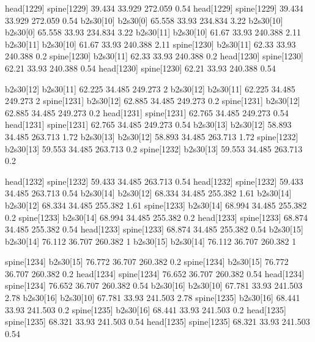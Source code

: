 head[1229]    spine[1229]    39.434    33.929    272.059    0.54
head[1229]    spine[1229]    39.434    33.929    272.059    0.54
b2s30[10]    b2s30[0]    65.558    33.93    234.834    3.22
b2s30[10]    b2s30[0]    65.558    33.93    234.834    3.22
b2s30[11]    b2s30[10]    61.67    33.93    240.388    2.11
b2s30[11]    b2s30[10]    61.67    33.93    240.388    2.11
spine[1230]    b2s30[11]    62.33    33.93    240.388    0.2
spine[1230]    b2s30[11]    62.33    33.93    240.388    0.2
head[1230]    spine[1230]    62.21    33.93    240.388    0.54
head[1230]    spine[1230]    62.21    33.93    240.388    0.54


b2s30[12]    b2s30[11]    62.225    34.485    249.273    2
b2s30[12]    b2s30[11]    62.225    34.485    249.273    2
spine[1231]    b2s30[12]    62.885    34.485    249.273    0.2
spine[1231]    b2s30[12]    62.885    34.485    249.273    0.2
head[1231]    spine[1231]    62.765    34.485    249.273    0.54
head[1231]    spine[1231]    62.765    34.485    249.273    0.54
b2s30[13]    b2s30[12]    58.893    34.485    263.713    1.72
b2s30[13]    b2s30[12]    58.893    34.485    263.713    1.72
spine[1232]    b2s30[13]    59.553    34.485    263.713    0.2
spine[1232]    b2s30[13]    59.553    34.485    263.713    0.2


head[1232]    spine[1232]    59.433    34.485    263.713    0.54
head[1232]    spine[1232]    59.433    34.485    263.713    0.54
b2s30[14]    b2s30[12]    68.334    34.485    255.382    1.61
b2s30[14]    b2s30[12]    68.334    34.485    255.382    1.61
spine[1233]    b2s30[14]    68.994    34.485    255.382    0.2
spine[1233]    b2s30[14]    68.994    34.485    255.382    0.2
head[1233]    spine[1233]    68.874    34.485    255.382    0.54
head[1233]    spine[1233]    68.874    34.485    255.382    0.54
b2s30[15]    b2s30[14]    76.112    36.707    260.382    1
b2s30[15]    b2s30[14]    76.112    36.707    260.382    1


spine[1234]    b2s30[15]    76.772    36.707    260.382    0.2
spine[1234]    b2s30[15]    76.772    36.707    260.382    0.2
head[1234]    spine[1234]    76.652    36.707    260.382    0.54
head[1234]    spine[1234]    76.652    36.707    260.382    0.54
b2s30[16]    b2s30[10]    67.781    33.93    241.503    2.78
b2s30[16]    b2s30[10]    67.781    33.93    241.503    2.78
spine[1235]    b2s30[16]    68.441    33.93    241.503    0.2
spine[1235]    b2s30[16]    68.441    33.93    241.503    0.2
head[1235]    spine[1235]    68.321    33.93    241.503    0.54
head[1235]    spine[1235]    68.321    33.93    241.503    0.54


